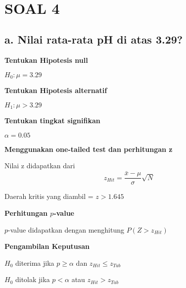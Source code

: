 \documentclass[11pt]{article}
\begin{document}
    
    \begin{center}
    \end{center}
    { \hspace*{\fill} \\}
    
    \hypertarget{soal-4}{%
\section{SOAL 4}\label{soal-4}}

    \hypertarget{a.-nilai-rata-rata-ph-di-atas-3.29}{%
\subsection{a. Nilai rata-rata pH di atas
3.29?}\label{a.-nilai-rata-rata-ph-di-atas-3.29}}

    \textbf{Tentukan Hipotesis null}

\(H_0 : \mu = 3.29\)

\textbf{Tentukan Hipotesis alternatif}

\(H_1 : \mu > 3.29\)

\textbf{Tentukan tingkat signifikan}

\(\alpha = 0.05\)

\textbf{Menggunakan one-tailed test dan perhitungan z}

Nilai z didapatkan dari
\[ z_{Hit} = \frac{\bar{x}-\mu}{\sigma}  \sqrt{N}\]

Daerah kritis yang diambil = \(z > 1.645\)

\textbf{Perhitungan \(p\)-value}

\(p\)-value didapatkan dengan menghitung \(P(Z > z_{Hit})\)

\textbf{Pengambilan Keputusan}

\(H_0\) diterima jika \(p \geq \alpha\) dan \(z_{Hit} \leq z_{Tab}\)

\(H_0\) ditolak jika \(p < \alpha\) atau \(z_{Hit} > z_{Tab}\)
\end{document}
